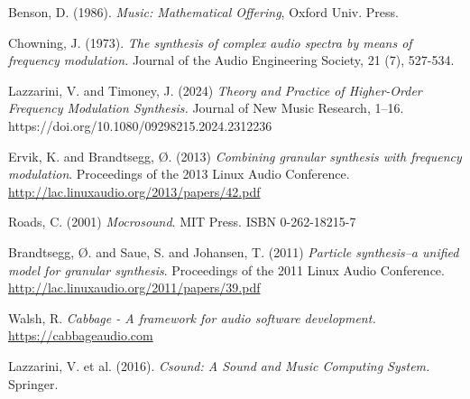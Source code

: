 \documentclass[runningheads,a4paper]{llncs}
\begin{document}
\begin{thebibliography}{99}

 Benson, D. (1986).\emph{ Music: Mathematical Offering}, Oxford Univ. Press.

 Chowning, J. (1973). \emph{The synthesis of complex audio spectra by means of frequency modulation.} Journal of the Audio Engineering Society, 21 (7), 527-534.
	
 Lazzarini, V. and Timoney, J. (2024) \emph{Theory and Practice of Higher-Order Frequency Modulation Synthesis.} Journal of New Music Research, 1–16. https://doi.org/10.1080/09298215.2024.2312236

 Ervik, K. and Brandtsegg, Ø. (2013) \emph{Combining granular synthesis with frequency modulation}. Proceedings of the 2013 Linux Audio Conference. \url{http://lac.linuxaudio.org/2013/papers/42.pdf}

 Roads, C. (2001) \emph{Mocrosound}. MIT Press.  ISBN 0-262-18215-7

 Brandtsegg, Ø. and Saue, S. and Johansen, T. (2011) \emph{Particle synthesis–a unified model for granular synthesis}. Proceedings of the 2011 Linux Audio Conference. \url{http://lac.linuxaudio.org/2011/papers/39.pdf}

 Walsh, R. \emph{Cabbage - A framework for audio software development.} \url{https://cabbageaudio.com}

 Lazzarini, V. et al. (2016). \emph{Csound: A Sound and Music Computing System.} Springer.



\end{thebibliography}
\end{document}
